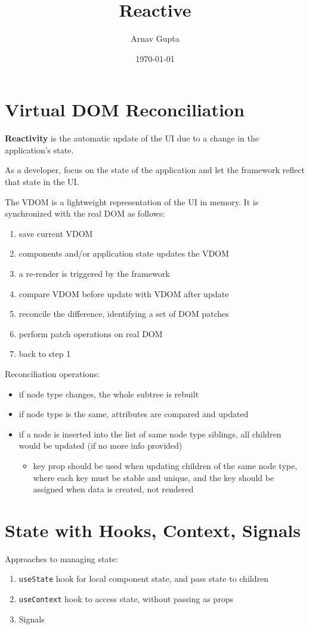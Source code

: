 \documentclass[11pt]{article}
\author{Arnav Gupta}
\date{\today}
\title{Reactive}
\begin{document}
\maketitle
\tableofcontents

\section{Virtual DOM Reconciliation}
\label{sec:orgd87e085}
\textbf{Reactivity} is the automatic update of the UI due to a change in the application's state.

As a developer, focus on the state of the application and let the framework reflect that
state in the UI.

The VDOM is a lightweight representation of the UI in memory.
It is synchronized with the real DOM as follows:
\begin{enumerate}
\item save current VDOM
\item components and/or application state updates the VDOM
\item a re-render is triggered by the framework
\item compare VDOM before update with VDOM after update
\item reconcile the difference, identifying a set of DOM patches
\item perform patch operations on real DOM
\item back to step 1
\end{enumerate}

Reconciliation operations:
\begin{itemize}
\item if node type changes, the whole subtree is rebuilt
\item if node type is the same, attributes are compared and updated
\item if a node is inserted into the list of same node type siblings, all children would be updated
(if no more info provided)
\begin{itemize}
\item key prop should be used when updating children of the same node type, where each key must be
stable and unique, and the key should be assigned when data is created, not rendered
\end{itemize}
\end{itemize}
\section{State with Hooks, Context, Signals}
\label{sec:org966cb39}
Approaches to managing state:
\begin{enumerate}
\item \texttt{useState} hook for local component state, and pass state to children
\item \texttt{useContext} hook to access state, without passing as props
\item Signals
\end{enumerate}
\end{document}
